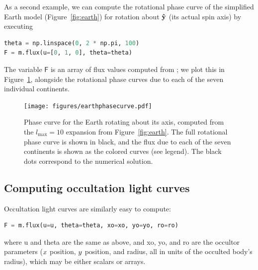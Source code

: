 \documentclass[modern]{aastex61}
\begin{document}
As a second example, we can compute the rotational phase curve of the simplified Earth model
(Figure~\ref{fig:earth}) for rotation about $\mathbf{\hat{y}}$ (its actual spin axis)
by executing
%
\begin{lstlisting}[language=Python,firstnumber=last]
theta = np.linspace(0, 2 * np.pi, 100)
F = m.flux(u=[0, 1, 0], theta=theta)
\end{lstlisting}
%
The variable $\textsf{F}$ is
an array of flux values computed from ; we plot this in
Figure~\ref{fig:earthphasecurve}, alongside the rotational phase curves due to each of
the seven individual continents.
%
\begin{figure}[ht!]
    \begin{centering}
    \texttt{[image: figures/earthphasecurve.pdf]}
    \caption{\label{fig:earthphasecurve}
             Phase curve for the Earth rotating about its axis, computed
             from the $l_\mathrm{max} = 10$ expansion from
             Figure~\ref{fig:earth}. The full rotational phase curve is shown in black,
             and the flux due to each of the seven continents is shown as
             the colored curves (see legend). The black dots correspond to the
             numerical solution.}
    \end{centering}
\end{figure}
%

\subsection{Computing occultation light curves}
\label{sec:starryoccultation}

Occultation light curves are similarly easy to compute:
%
\begin{lstlisting}[language=Python,firstnumber=last]
F = m.flux(u=u, theta=theta, xo=xo, yo=yo, ro=ro)
\end{lstlisting}
%
where \textsf{u} and \textsf{theta} are the same as above, and
\textsf{xo}, \textsf{yo}, and \textsf{ro} are the occultor parameters
($\mbox{$x$}$ position, $\mbox{$y$}$ position, and radius, all in units of the
occulted body's radius), which may be either scalars
or arrays.

%
\end{document}
